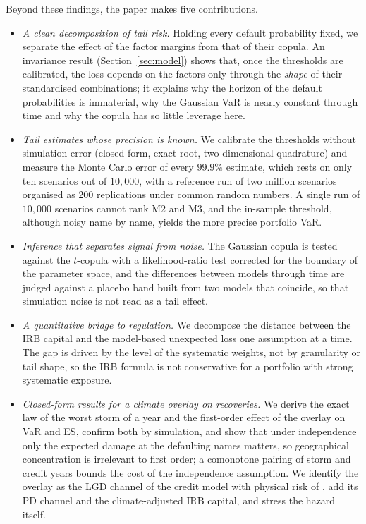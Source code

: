 Beyond these findings, the paper makes five contributions.
\begin{itemize}
\item \emph{A clean decomposition of tail risk.} Holding every default probability fixed, we separate the effect of the factor margins from that of their copula. An invariance result (Section~\ref{sec:model}) shows that, once the thresholds are calibrated, the loss depends on the factors only through the \emph{shape} of their standardised combinations; it explains why the horizon of the default probabilities is immaterial, why the Gaussian VaR is nearly constant through time and why the copula has so little leverage here.
\item \emph{Tail estimates whose precision is known.} We calibrate the thresholds without simulation error (closed form, exact root, two-dimensional quadrature) and measure the Monte Carlo error of every $99.9\%$ estimate, which rests on only ten scenarios out of $10{,}000$, with a reference run of two million scenarios organised as 200 replications under common random numbers. A single run of $10{,}000$ scenarios cannot rank M2 and M3, and the in-sample threshold, although noisy name by name, yields the more precise portfolio VaR.
\item \emph{Inference that separates signal from noise.} The Gaussian copula is tested against the $t$-copula with a likelihood-ratio test corrected for the boundary of the parameter space, and the differences between models through time are judged against a placebo band built from two models that coincide, so that simulation noise is not read as a tail effect.
\item \emph{A quantitative bridge to regulation.} We decompose the distance between the IRB capital and the model-based unexpected loss one assumption at a time. The gap is driven by the level of the systematic weights, not by granularity or tail shape, so the IRB formula is not conservative for a portfolio with strong systematic exposure.
\item \emph{Closed-form results for a climate overlay on recoveries.} We derive the exact law of the worst storm of a year and the first-order effect of the overlay on VaR and ES, confirm both by simulation, and show that under independence only the expected damage at the defaulting names matters, so geographical concentration is irrelevant to first order; a comonotone pairing of storm and credit years bounds the cost of the independence assumption. We identify the overlay as the LGD channel of the credit model with physical risk of \citet{Pozdyshev25}, add its PD channel and the climate-adjusted IRB capital, and stress the hazard itself.
\end{itemize}
